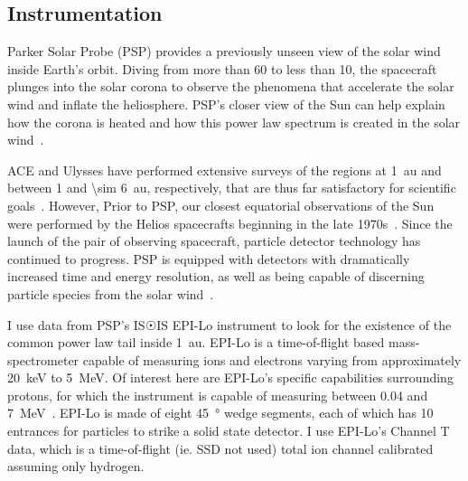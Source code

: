 \documentclass[letterpaper,11pt]{article}
\begin{document}
\subsection{Instrumentation}
Parker Solar Probe (PSP) provides a previously unseen view of the solar wind inside Earth's orbit.  Diving from more than 60 to less than \SI{10}{\solarradius}, the spacecraft plunges into the solar corona to observe the phenomena that accelerate the solar wind and inflate the heliosphere.  PSP's closer view of the Sun can help explain how the corona is heated and how this power law spectrum is created in the solar wind~\citep{McComas2014,McComas2007}.

ACE and Ulysses have performed extensive surveys of the regions at \SI{1}{\astronomicalunit} and between 1 and \SI{\sim 6}{\astronomicalunit}, respectively, that are thus far satisfactory for scientific goals~\citep{McComas2007}.  However, Prior to PSP, our closest equatorial observations of the Sun were performed by the Helios spacecrafts beginning in the late 1970s~\citep{McComas2007}.  Since the launch of the pair of observing spacecraft, particle detector technology has continued to progress.  PSP is equipped with detectors with dramatically increased time and energy resolution, as well as being capable of discerning particle species from the solar wind~\citep{McComas2014}.

I use data from PSP's IS$\Sun$IS EPI-Lo instrument to look for the existence of the common power law tail inside \SI{1}{\astronomicalunit}.  EPI-Lo is a time-of-flight based mass-spectrometer capable of measuring ions and electrons varying from approximately \SI{20}{\kilo\electronvolt} to \SI{5}{\mega\electronvolt}.  Of interest here are EPI-Lo's specific capabilities surrounding protons, for which the instrument is capable of measuring between 0.04 and \SI{7}{\mega\electronvolt}~\citep{McComas2014}.  EPI-Lo is made of eight \SI{45}{\degree} wedge segments, each of which has 10 entrances for particles to strike a solid state detector.  I use EPI-Lo's Channel T data, which is a time-of-flight (ie. SSD not used) total ion channel calibrated assuming only hydrogen.

\end{document}
